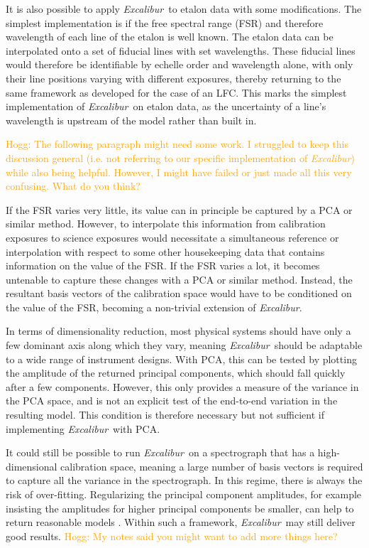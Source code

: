 \documentclass[modern]{aastex63}
\newcommand{\project}[1]{\textsl{#1}}
\newcommand{\name}{\project{Excalibur}}
\newcommand{\lz}[1]{\textcolor{orange}{#1}}
\begin{document}
It is also possible to apply \name\ to etalon data with some modifications.  The simplest implementation is if the free spectral range (FSR) and therefore wavelength of each line of the etalon is well known.  The etalon data can be interpolated onto a set of fiducial lines with set wavelengths.  These fiducial lines would therefore be identifiable by echelle order and wavelength alone, with only their line positions varying with different exposures, thereby returning to the same framework as developed for the case of an LFC.  This marks the simplest implementation of \name\ on etalon data, as the uncertainty of a line's wavelength is upstream of the model rather than built in.

\lz{Hogg: The following paragraph might need some work.  I struggled to keep this discussion general (i.e. not referring to our specific implementation of \name) while also being helpful.  However, I might have failed or just made all this very confusing.  What do you think?}

If the FSR varies very little, its value can in principle be captured by a PCA or similar method.  However, to interpolate this information from calibration exposures to science exposures would necessitate a simultaneous reference or interpolation with respect to some other housekeeping data that contains information on the value of the FSR.  If the FSR varies a lot, it becomes untenable to capture these changes with a PCA or similar method.  Instead, the resultant basis vectors of the calibration space would have to be conditioned on the value of the FSR, becoming a non-trivial extension of \name.

In terms of dimensionality reduction, most physical systems should have only a few dominant axis along which they vary, meaning \name\ should be adaptable to a wide range of instrument designs.  With PCA, this can be tested by plotting the amplitude of the returned principal components, which should fall quickly after a few components.  However, this only provides a measure of the variance in the PCA space, and is not an explicit test of the end-to-end variation in the resulting model.  This condition is therefore necessary but not sufficient if implementing \name\ with PCA.

It could still be possible to run \name\ on a spectrograph that has a high-dimensional calibration space, meaning a large number of basis vectors is required to capture all the variance in the spectrograph.  In this regime, there is always the risk of over-fitting.  Regularizing the principal component amplitudes, for example insisting the amplitudes for higher principal components be smaller, can help to return reasonable models \citep{formanmackey2015} .  Within such a framework, \name\ may still deliver good results.
\lz{Hogg: My notes said you might want to add more things here?}
\end{document}
